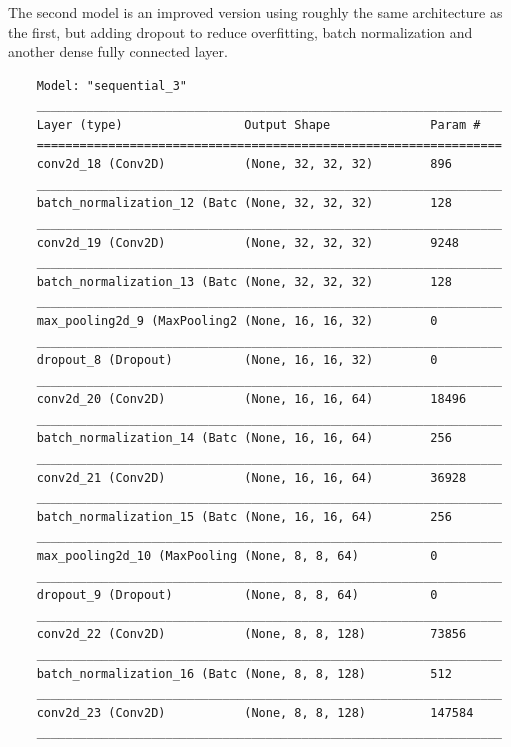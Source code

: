 The second model is an improved version using roughly the same architecture as the first, but adding dropout to reduce overfitting, batch normalization and another dense fully connected layer.
\begin{center}
    \begin{verbatim}
    Model: "sequential_3"
    _________________________________________________________________
    Layer (type)                 Output Shape              Param #   
    =================================================================
    conv2d_18 (Conv2D)           (None, 32, 32, 32)        896       
    _________________________________________________________________
    batch_normalization_12 (Batc (None, 32, 32, 32)        128       
    _________________________________________________________________
    conv2d_19 (Conv2D)           (None, 32, 32, 32)        9248      
    _________________________________________________________________
    batch_normalization_13 (Batc (None, 32, 32, 32)        128       
    _________________________________________________________________
    max_pooling2d_9 (MaxPooling2 (None, 16, 16, 32)        0         
    _________________________________________________________________
    dropout_8 (Dropout)          (None, 16, 16, 32)        0         
    _________________________________________________________________
    conv2d_20 (Conv2D)           (None, 16, 16, 64)        18496     
    _________________________________________________________________
    batch_normalization_14 (Batc (None, 16, 16, 64)        256       
    _________________________________________________________________
    conv2d_21 (Conv2D)           (None, 16, 16, 64)        36928     
    _________________________________________________________________
    batch_normalization_15 (Batc (None, 16, 16, 64)        256       
    _________________________________________________________________
    max_pooling2d_10 (MaxPooling (None, 8, 8, 64)          0         
    _________________________________________________________________
    dropout_9 (Dropout)          (None, 8, 8, 64)          0         
    _________________________________________________________________
    conv2d_22 (Conv2D)           (None, 8, 8, 128)         73856     
    _________________________________________________________________
    batch_normalization_16 (Batc (None, 8, 8, 128)         512       
    _________________________________________________________________
    conv2d_23 (Conv2D)           (None, 8, 8, 128)         147584    
    _________________________________________________________________

\end{verbatim}
\end{center}
